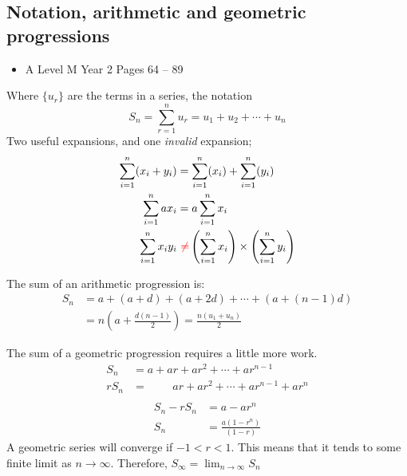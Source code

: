 \documentclass[11pt, a4paper]{article}
\begin{document}
\subsection{Notation, arithmetic and geometric progressions}
\begin{itemize}
\item A Level M Year 2 \hspace{1cm} \phantom{ AS / } Pages 64 -- 89
\end{itemize} \par
Where $\{u_{r}\}$ are the terms in a series, the notation
\begin{equation*}
S_{n}=\sum_{r=1}^{n}u_{r}=u_{1}+u_{2}+\cdots+u_{n}
\end{equation*}
Two useful expansions, and one \emph{invalid} expansion;
\begin{align*}
\sum_{i=1}^{n}(x_{i}+y_{i})&=\sum_{i=1}^{n}(x_{i})+\sum_{i=1}^{n}(y_{i}) \\
\sum_{i=1}^{n}ax_{i}&=a\sum_{i=1}^{n}x_{i} \\
\sum_{i=1}^{n}x_{i}y_{i}&\,\textcolor{red}{\,\neq}\left(\sum_{i=1}^{n}x_{i}\right)\times\left(\sum_{i=1}^{n}y_{i}\right)
\end{align*} \newline \par

The sum of an arithmetic progression is:
\begin{align*}
S_{n}&=a+(a+d)+(a+2d)+\cdots+(a+(n-1)d) \\
&=n\left( a+\frac{d(n-1)}{2} \right)=\frac{n(u_{1}+u_{n})}{2}
\end{align*} \newline \par

The sum of a geometric progression requires a little more work. 
\begin{align*}
S_{n}&=a+ar+ar^{2}+\cdots+ar^{n-1} \\
rS_{n}&=\phantom{a\,+\,\,}ar+ar^{2}+\cdots+ar^{n-1}+ar^{n}\\
\end{align*}
\vspace{-1.5cm}
\begin{align*}
S_{n}-rS_{n}&=a-ar^{n} \\
S_{n}&=\frac{a(1-r^{n})}{(1-r)}
\end{align*}
A geometric series will converge if $-1<r<1$. This means that it tends to some finite limit as $n\to\infty$. Therefore, $S_{\infty}=\lim_{n\to\infty}S_{n}$
\vspace{0.5cm}
\end{document}
